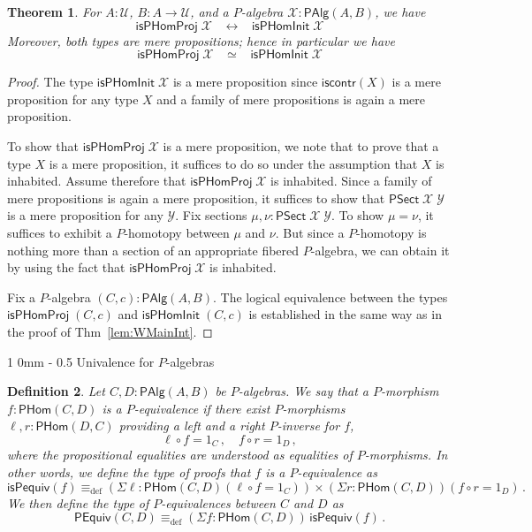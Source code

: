 \documentclass[reqno,10pt,a4paper,oneside]{amsart}
\makeatletter
\numberwithin{equation}{section}
\renewcommand{\section}{\@startsection
  {section}%
   {1}%
  {0mm}%
   {-\baselineskip}%
  {0.5\baselineskip}%
   {\Large\bfseries}}%
\theoremstyle{mythm}
\newtheorem{theorem}{Theorem}[section]
\theoremstyle{mydef}
\newtheorem{definition}[theorem]{Definition}
\theoremstyle{myrmk}
\newcommand{\ie}{\text{i.e.\ }}
\newcommand{\myemph}[1]{\textit{#1}}
\newcommand{\deq}{\equiv}
\newcommand{\defeq}{\deq_{\mathrm{def}}}
\newcommand{\co}{\colon}
\newcommand{\iscontr}{\mathsf{iscontr}}
\newcommand{\U}{\mathcal{U}}
\newcommand{\WAlg}{\mathsf{PAlg}}
\newcommand{\WHom}{\mathsf{PHom}}
\newcommand{\WFibHom}{\mathsf{PSect}}
\newcommand{\IsWHInit}{\mathsf{isPHomInit}}
\newcommand{\IsWHProj}{\mathsf{isPHomProj}}
\newcommand{\X}{\mathcal{X}}
\newcommand{\Y}{\mathcal{Y}}
\makeatother
\begin{document}
\begin{theorem}\label{lem:WMainInternal}
For $A:\U$, $B : A \to \U$, and a $P$-algebra $\X : \WAlg(A,B)$, we have
\[ \IsWHProj \; \X \;\;\; \leftrightarrow \;\;\; \IsWHInit \; \X \]
Moreover, both types are mere propositions; hence in particular we have
\[ \IsWHProj \; \X \;\;\; \simeq \;\;\; \IsWHInit \; \X \]
\end{theorem}
\begin{proof}
The type $\IsWHInit \; \X$ is a mere proposition since $\iscontr(X)$ is a mere proposition for any type $X$ and a family of mere propositions is again a mere proposition.

To show that $\IsWHProj \; \X$ is a mere proposition, we note that to prove that a type $X$ is a mere proposition, it suffices to do so under the assumption that $X$ is inhabited. Assume therefore that $\IsWHProj \; \X$ is inhabited. Since a family of mere propositions is again a mere proposition, it suffices to show that $\WFibHom \; \X \; \Y$ is a mere proposition for any $\Y$. Fix sections $\mu, \nu : \WFibHom \; \X \; \Y$. To show $\mu = \nu$, it suffices to exhibit a $P$-homotopy between $\mu$ and $\nu$. But since a $P$-homotopy is nothing more than a section of an appropriate fibered $P$-algebra, we can obtain it by using the fact that $\IsWHProj \; \X$ is inhabited.

Fix a $P$-algebra $(C,c) : \WAlg(A,B)$. The logical equivalence between the types $\IsWHProj \; (C,c)$ and $\IsWHInit \; (C,c)$ is established in the same way as in the proof of Thm~\ref{lem:WMainInt}. 
\end{proof}


\section{Univalence for $P$-algebras}

\begin{definition} Let $C,D : \WAlg(A,B)$ be $P$-algebras. We say that a $P$-morphism $f \co \WHom(C,D)$ is a \myemph{$P$-equivalence}
if there exist $P$-morphisms $\ell,r \co \WHom(D,C)$ providing a left and a right $P$-inverse for $f$, \ie 
\[ 
\ell \circ f = 1_C \, , \quad f \circ r = 1_D \, ,
\]
where the propositional equalities are understood as equalities of $P$-morphisms. In other words, we define the type of proofs that $f$ is a $P$-equivalence as
\[
\mathsf{isPequiv}(f) \defeq   ( \Sigma \ell : \WHom(C,D) ( \ell \circ f = 1_C )) \times 
    (\Sigma r : \WHom(C, D))(  f \circ r = 1_D ) \, .
\]
We then define the type of \emph{$P$-equivalences} between $C$ and $D$ as
\[
\mathsf{PEquiv}(C, D)
\defeq    (\Sigma f : \WHom(C,D)) \, \mathsf{isPequiv}(f)  \, . 
\] 
\end{definition}
\end{document}
